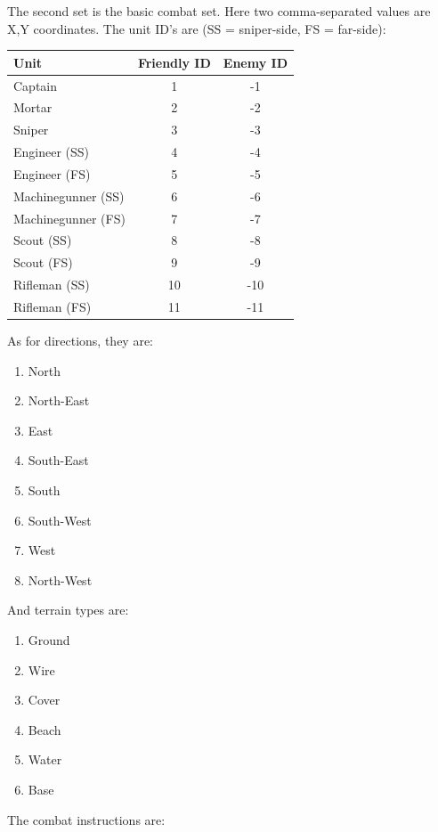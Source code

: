 \documentclass{article}
\begin{document}
The second set is the basic combat set. Here two comma-separated values are X,Y
coordinates. The unit ID's are (SS = sniper-side, FS = far-side):

\begin{tabular}{l|c|c}
    Unit & Friendly ID & Enemy ID \\ \hline
    Captain & 1 & -1 \\ \hline
    Mortar & 2 & -2 \\ \hline
    Sniper & 3 & -3 \\ \hline
    Engineer (SS) & 4 & -4 \\ \hline
    Engineer (FS) & 5 & -5 \\ \hline
    Machinegunner (SS) & 6 & -6 \\ \hline
    Machinegunner (FS) & 7 & -7 \\ \hline
    Scout (SS) & 8 & -8 \\ \hline
    Scout (FS) & 9 & -9 \\ \hline
    Rifleman (SS) & 10 & -10 \\ \hline
    Rifleman (FS) & 11 & -11 \\ \hline
\end{tabular}

As for directions, they are:

\begin{enumerate}[noitemsep]
    \item North
    \item North-East
    \item East
    \item South-East
    \item South
    \item South-West
    \item West
    \item North-West
\end{enumerate}

And terrain types are:

\begin{enumerate}[noitemsep]
    \item Ground
    \item Wire
    \item Cover
    \item Beach
    \item Water
    \item Base
\end{enumerate}

The combat instructions are:
\end{document}
